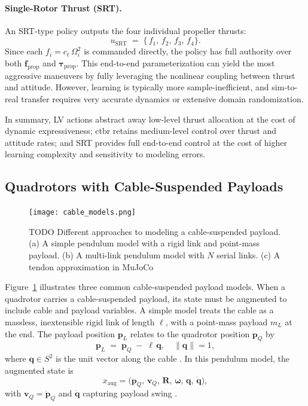 \paragraph{Single-Rotor Thrust (SRT).}  
An SRT-type policy outputs the four individual propeller thrusts:
\[
u_{\mathrm{SRT}} \;=\; \{\,f_{1},\,f_{2},\,f_{3},\,f_{4}\}.
\]
Since each \(f_{i} = c_{\ell}\,\Omega_{i}^{2}\) is commanded directly, the policy has full authority over both \(\mathbf{f}_{\mathrm{prop}}\) and \(\boldsymbol{\tau}_{\mathrm{prop}}\). This end-to-end parameterization can yield the most aggressive maneuvers by fully leveraging the nonlinear coupling between thrust and attitude. However, learning is typically more sample-inefficient, and sim-to-real transfer requires very accurate dynamics or extensive domain randomization.

In summary, LV actions abstract away low-level thrust allocation at the cost of dynamic expressiveness; \gls{ctbr} retains medium-level control over thrust and attitude rates; and SRT provides full end-to-end control at the cost of higher learning complexity and sensitivity to modeling errors.
\subsection{Quadrotors with Cable-Suspended Payloads}
\label{sec:quadrotor_with_payloads}
\begin{figure}

  \centering
  \texttt{[image: cable\_models.png]}
  \caption{TODO Different approaches to modeling a cable-suspended payload. (a) A simple pendulum model with a rigid link and point-mass payload. (b) A multi-link pendulum model with \(N\) serial links. (c) A tendon approximation in MuJoCo}
  \label{fig:cable_models}
\end{figure}
Figure~\ref{fig:cable_models} illustrates three common cable‐suspended payload models.
When a quadrotor carries a cable-suspended payload, its state must be augmented to include cable and payload variables. A simple model treats the cable as a massless, inextensible rigid link of length \(\ell\), with a point-mass payload \(m_{L}\) at the end. The payload position \(\mathbf{p}_{L}\) relates to the quadrotor position \(\mathbf{p}_{Q}\) by
\[
\mathbf{p}_{L} \;=\; \mathbf{p}_{Q} \;-\; \ell\,\mathbf{q}, 
\quad
\|\mathbf{q}\| = 1,
\]
where \(\mathbf{q}\in S^{2}\) is the unit vector along the cable \cite{estevez_review_2024}. In this pendulum model, the augmented state is
\[
x_{\mathrm{aug}} 
= \bigl(\mathbf{p}_{Q},\,\mathbf{v}_{Q},\,\mathbf{R},\,\boldsymbol{\omega},\,\mathbf{q},\,\dot{\mathbf{q}}\bigr),
\]
with \(\mathbf{v}_{Q} = \dot{\mathbf{p}}_{Q}\) and \(\dot{\mathbf{q}}\) capturing payload swing \cite{Wahba2024}.

